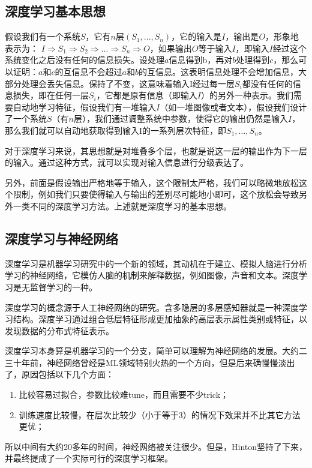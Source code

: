 \documentclass[UTF8]{ctexart}
\begin{document}
\subsection*{深度学习基本思想}
\par 假设我们有一个系统$S$，它有$n$层$(S_1,\dots,S_n)$，它的输入是$I$，输出是$O$，形象地表示为： $I\Rightarrow S_1\Rightarrow S_2 \Rightarrow \dots \Rightarrow S_n \Rightarrow O$，如果输出$O$等于输入$I$，即输入$I$经过这个系统变化之后没有任何的信息损失。设处理$a$信息得到b，再对$b$处理得到$c$，那么可以证明：$a$和$c$的互信息不会超过$a$和$b$的互信息。这表明信息处理不会增加信息，大部分处理会丢失信息。保持了不变，这意味着输入I经过每一层$S_i$都没有任何的信息损失，即在任何一层$S_i$，它都是原有信息（即输入$I$）的另外一种表示。我们需要自动地学习特征，假设我们有一堆输入$I$（如一堆图像或者文本），假设我们设计了一个系统$S$（有$n$层），我们通过调整系统中参数，使得它的输出仍然是输入$I$，那么我们就可以自动地获取得到输入I的一系列层次特征，即$S_1,\dots,S_n$。

\par 对于深度学习来说，其思想就是对堆叠多个层，也就是说这一层的输出作为下一层的输入。通过这种方式，就可以实现对输入信息进行分级表达了。

\par 另外，前面是假设输出严格地等于输入，这个限制太严格，我们可以略微地放松这个限制，例如我们只要使得输入与输出的差别尽可能地小即可，这个放松会导致另外一类不同的深度学习方法。上述就是深度学习的基本思想。
\subsection*{深度学习与神经网络}
\par 深度学习是机器学习研究中的一个新的领域，其动机在于建立、模拟人脑进行分析学习的神经网络，它模仿人脑的机制来解释数据，例如图像，声音和文本。深度学习是无监督学习的一种。

\par 深度学习的概念源于人工神经网络的研究。含多隐层的多层感知器就是一种深度学习结构。深度学习通过组合低层特征形成更加抽象的高层表示属性类别或特征，以发现数据的分布式特征表示。

\par 深度学习本身算是机器学习的一个分支，简单可以理解为神经网络的发展。大约二三十年前，神经网络曾经是ML领域特别火热的一个方向，但是后来确慢慢淡出了，原因包括以下几个方面：
\begin{enumerate}[\indent 1)]
\item 比较容易过拟合，参数比较难tune，而且需要不少trick；

\item 训练速度比较慢，在层次比较少（小于等于3）的情况下效果并不比其它方法更优；
\end{enumerate}
\par 所以中间有大约20多年的时间，神经网络被关注很少。但是，Hinton坚持了下来，并最终提成了一个实际可行的深度学习框架。
\end{document}
